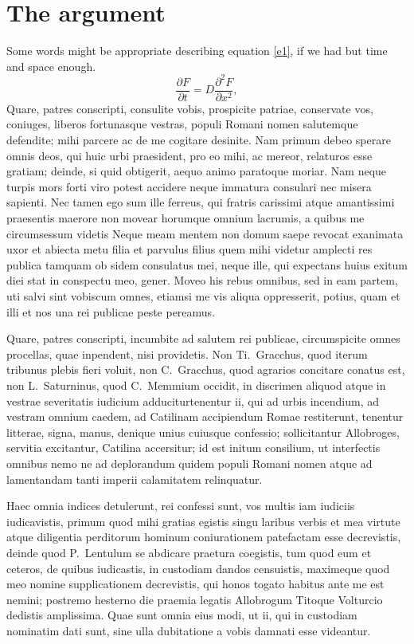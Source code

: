 \documentclass[a4paper,12pt,twoside,swedish]{report}
\begin{document}
\section{The argument}
Some words might be appropriate describing equation \ref{e1}, if we
had but time and space enough.
\begin{equation}
\frac{\partial F}{\partial
t}=D\frac{\partial^2 F}{\partial x^2},
\label{e1}
\end{equation}
Quare, patres conscripti, consulite vobis, prospicite patriae,
conservate vos, coniuges, liberos fortunasque vestras, populi Romani
nomen salutemque defendite; mihi parcere ac de me cogitare desinite. Nam
primum debeo sperare omnis deos, qui huic urbi praesident, pro eo mihi,
ac mereor, relaturos esse gratiam; deinde, si quid obtigerit, aequo
animo paratoque moriar. Nam neque turpis mors forti viro potest accidere
neque immatura consulari nec misera sapienti. Nec tamen ego sum ille
ferreus, qui fratris carissimi atque amantissimi praesentis maerore non
movear horumque omnium lacrumis, a quibus me circumsessum videtis Neque
meam mentem non domum saepe revocat exanimata uxor et abiecta metu filia
et parvulus filius quem mihi videtur amplecti res publica tamquam ob
sidem consulatus mei, neque ille, qui expectans huius exitum diei stat
in conspectu meo, gener. Moveo his rebus omnibus, sed in eam partem, uti
salvi sint vobiscum omnes, etiamsi me vis aliqua oppresserit, potius,
quam et illi et nos una rei publicae peste pereamus.

Quare, patres conscripti, incumbite ad salutem rei publicae,
circumspicite omnes procellas, quae inpendent, nisi providetis. Non
Ti.~Gracchus, quod iterum tribunus plebis fieri voluit, non
C.~Gracchus, quod agrarios concitare conatus est, non L.~Saturninus,
quod C.~Memmium occidit, in discrimen aliquod atque in vestrae
severitatis iudicium adduciturtenentur ii, qui ad urbis incendium, ad
vestram omnium caedem, ad Catilinam accipiendum Romae restiterunt,
tenentur litterae, signa, manus, denique unius cuiusque confessio;
sollicitantur Allobroges, servitia excitantur, Catilina accersitur; id
est initum consilium, ut interfectis omnibus nemo ne ad deplorandum
quidem populi Romani nomen atque ad lamentandam tanti imperii
calamitatem relinquatur.

Haec omnia indices detulerunt, rei confessi sunt, vos multis iam iudiciis
iudicavistis, primum quod mihi gratias egistis singu laribus verbis et
mea virtute atque diligentia perditorum hominum coniurationem patefactam
esse decrevistis, deinde quod P.~Lentulum se abdicare praetura
coegistis, tum quod eum et ceteros, de quibus iudicastis, in custodiam
dandos censuistis, maximeque quod meo nomine supplicationem decrevistis,
qui honos togato habitus ante me est nemini; postremo hesterno die
praemia legatis Allobrogum Titoque Volturcio dedistis amplissima. Quae
sunt omnia eius modi, ut ii, qui in custodiam nominatim dati sunt, sine
ulla dubitatione a vobis damnati esse videantur.
\end{document}
